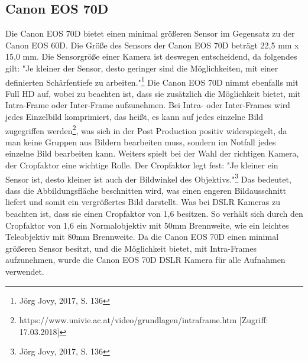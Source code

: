 \subsection{Canon EOS 70D}
Die Canon EOS 70D bietet einen minimal größeren Sensor im Gegensatz zu der Canon EOS 60D. Die Größe des Sensors der Canon EOS 70D beträgt 22,5 mm x 15,0 mm. Die Sensorgröße einer Kamera ist deswegen entscheidend, da folgendes gilt: "Je kleiner der Sensor, desto geringer sind die Möglichkeiten, mit einer definierten Schärfentiefe zu arbeiten."\footnote{\label{foot:1}Jörg Jovy, 2017, S. 136} Die Canon EOS 70D nimmt ebenfalls mit Full HD auf, wobei zu beachten ist, dass sie zusätzlich die Möglichkeit bietet, mit Intra-Frame oder Inter-Frame aufzunehmen. Bei Intra- oder Inter-Frames wird jedes Einzelbild komprimiert, das heißt, es kann auf jedes einzelne Bild zugegriffen werden\footnote{\label{foot:2}https://www.univie.ac.at/video/grundlagen/intraframe.htm [Zugriff: 17.03.2018]}, was sich in der Post Production positiv widerspiegelt, da man keine Gruppen aus Bildern bearbeiten muss, sondern im Notfall jedes einzelne Bild bearbeiten kann. Weiters spielt bei der Wahl der richtigen Kamera, der Cropfaktor eine wichtige Rolle. Der Cropfaktor legt fest: "Je kleiner ein Sensor ist, desto kleiner ist auch der Bildwinkel des Objektivs."\footnote{\label{foot:3}Jörg Jovy, 2017, S. 136} Das bedeutet, dass die Abbildungsfläche beschnitten wird, was einen engeren Bildausschnitt liefert und somit ein vergrößertes Bild darstellt. Was bei DSLR Kameras zu beachten ist, dass sie einen Cropfaktor von 1,6 besitzen. So verhält sich durch den Cropfaktor von 1,6 ein Normalobjektiv mit 50mm Brennweite, wie ein leichtes Teleobjektiv mit 80mm Brennweite. 
Da die Canon EOS 70D einen minimal größeren Sensor besitzt, und die Möglichkeit bietet, mit Intra-Frames aufzunehmen, wurde die Canon EOS 70D DSLR Kamera für alle Aufnahmen verwendet.
